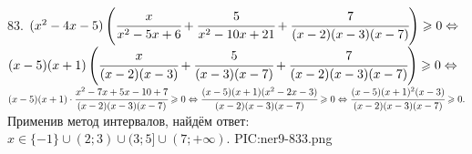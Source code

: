 83. $(x^2-4x-5)\left(\cfrac{x}{x^2-5x+6}+\cfrac{5}{x^2-10x+21}+\cfrac{7}{(x-2)(x-3)(x-7)}\right)\geqslant0\Leftrightarrow$\\$
(x-5)(x+1)\left(\cfrac{x}{(x-2)(x-3)}+\cfrac{5}{(x-3)(x-7)}+\cfrac{7}{(x-2)(x-3)(x-7)}\right)\geqslant0\Leftrightarrow$\\$
(x-5)(x+1)\cdot\cfrac{x^2-7x+5x-10+7}{(x-2)(x-3)(x-7)}\geqslant0\Leftrightarrow
\cfrac{(x-5)(x+1)(x^2-2x-3)}{(x-2)(x-3)(x-7)}\geqslant0\Leftrightarrow
\cfrac{(x-5)(x+1)^2(x-3)}{(x-2)(x-3)(x-7)}\geqslant0.$ Применив метод интервалов, найдём ответ: $x\in\{-1\}\cup(2;3)\cup(3;5]\cup(7;+\infty).$
{{PIC:ner9-833.png}}\\
